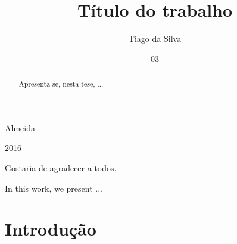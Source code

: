 \documentclass[tcc2]{uftex}
\begin{document}
  \title{Título do trabalho}
  \author{Tiago da Silva}{Almeida}
  

  \date{03}{2016}



  \maketitle

  \frontmatter
  \dedication{A algu\'em cujo valor \'e digno desta dedicat\'oria.}

  \begin{acknowledgement}
  Gostaria de agradecer a todos.
  \end{acknowledgement}

  \begin{abstract}
  Apresenta-se, nesta tese, ...
  \end{abstract}

  \begin{foreignabstract}
  In this work, we present ...
  \end{foreignabstract}


\printlosymbols  
\printloabbreviations
\listoffigures            
\listoftables 
\tableofcontents 

\mainmatter
\onehalfspacing
\chapter{Introdução}
\label{cap:introducao}
\end{document}
